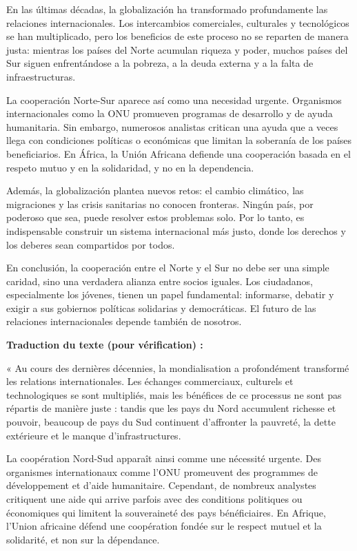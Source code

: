 \documentclass[11pt]{article}
\begin{document}
\begin{textebox}
En las últimas décadas, la globalización ha transformado profundamente las relaciones internacionales. Los intercambios comerciales, culturales y tecnológicos se han multiplicado, pero los beneficios de este proceso no se reparten de manera justa: mientras los países del Norte acumulan riqueza y poder, muchos países del Sur siguen enfrentándose a la pobreza, a la deuda externa y a la falta de infraestructuras.

La cooperación Norte-Sur aparece así como una necesidad urgente. Organismos internacionales como la ONU promueven programas de desarrollo y de ayuda humanitaria. Sin embargo, numerosos analistas critican una ayuda que a veces llega con condiciones políticas o económicas que limitan la soberanía de los países beneficiarios. En África, la Unión Africana defiende una cooperación basada en el respeto mutuo y en la solidaridad, y no en la dependencia.

Además, la globalización plantea nuevos retos: el cambio climático, las migraciones y las crisis sanitarias no conocen fronteras. Ningún país, por poderoso que sea, puede resolver estos problemas solo. Por lo tanto, es indispensable construir un sistema internacional más justo, donde los derechos y los deberes sean compartidos por todos.

En conclusión, la cooperación entre el Norte y el Sur no debe ser una simple caridad, sino una verdadera alianza entre socios iguales. Los ciudadanos, especialmente los jóvenes, tienen un papel fundamental: informarse, debatir y exigir a sus gobiernos políticas solidarias y democráticas. El futuro de las relaciones internacionales depende también de nosotros.
\end{textebox}

\textbf{Traduction du texte (pour vérification) :}

« Au cours des dernières décennies, la mondialisation a profondément transformé les relations internationales. Les échanges commerciaux, culturels et technologiques se sont multipliés, mais les bénéfices de ce processus ne sont pas répartis de manière juste : tandis que les pays du Nord accumulent richesse et pouvoir, beaucoup de pays du Sud continuent d'affronter la pauvreté, la dette extérieure et le manque d'infrastructures.

La coopération Nord-Sud apparaît ainsi comme une nécessité urgente. Des organismes internationaux comme l'ONU promeuvent des programmes de développement et d'aide humanitaire. Cependant, de nombreux analystes critiquent une aide qui arrive parfois avec des conditions politiques ou économiques qui limitent la souveraineté des pays bénéficiaires. En Afrique, l'Union africaine défend une coopération fondée sur le respect mutuel et la solidarité, et non sur la dépendance.
\end{document}
